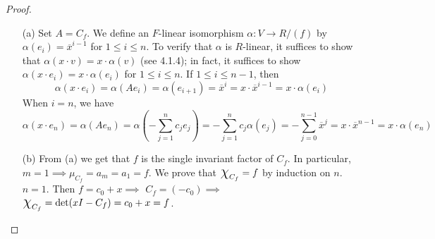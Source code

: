 \documentclass[11pt]{book}
\theoremstyle{definition}   \newtheorem{defn}[counter]{Definition} %
\newcommand{\ov}{\overline}   \newcommand{\wt}{\widetilde}
\newcommand{\Chi}{\mbox{\Large $\chi$}}
\DeclareMathOperator{\ra}{\rightarrow}   \DeclareMathOperator{\Poly}{\mathbf{P}}   \DeclareMathOperator{\spn}{\textnormal{span}}   \DeclareMathOperator{\aut}{\textnormal{Aut}}
\numberwithin{counter}{chapter}
\begin{document}
\begin{proof}\ 
\begin{enumerate}
\item[(a)] Set $A = C_f$. We define an $F$-linear isomorphism $\alpha : V \ra R/(f)$ by $\alpha(e_i) = \ov{x}^{i-1}$ for $1 \leq i \leq n$. To verify that $\alpha$ is $R$-linear, it suffices to show that $\alpha(x \cdot v) = x \cdot \alpha(v)$ (see 4.1.4); in fact, it suffices to show $\alpha(x \cdot e_i) = x \cdot \alpha(e_i)$ for $1 \leq i \leq n$. If $1 \leq i \leq n-1$, then 
	\[\alpha(x \cdot e_i) = \alpha(A e_i) = \alpha(e_{i+1}) = \ov{x}^i = x \cdot \ov{x}^{i-1} = x \cdot \alpha(e_i) \]
When $i = n$, we have
	\[\alpha(x \cdot e_n) = \alpha(A e_n) = \alpha\left(-\sum_{j=1}^n c_j e_j \right) = -\sum_{j=1}^n c_j \alpha(e_j) = -\sum_{j=0}^{n-1} \ov{x}^j = x \cdot \ov{x}^{n-1} = x \cdot \alpha(e_n) \]

\item[(b)] From (a) we get that $f$ is the single invariant factor of $C_f$. In particular, $m = 1 \implies \mu_{C_f} = a_m = a_1 = f$. We prove that $\Chi_{C_f} = f$ by induction on $n$. \\

$n = 1$. Then $f = c_0 + x \implies $ $C_f = (-c_0) \implies $ $\Chi_{C_f} = \det(xI - C_f) = c_0 + x = f$. \\


\end{enumerate}
\end{proof}
\end{document}
